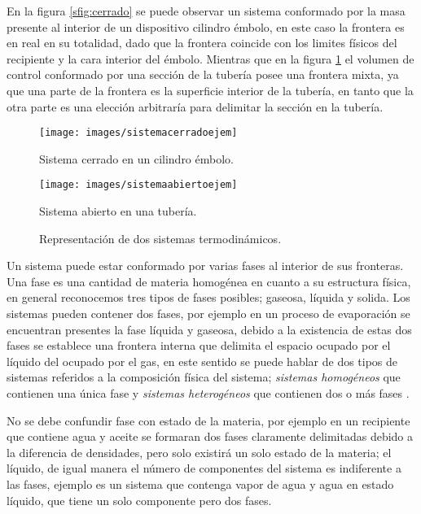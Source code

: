 \documentclass[../master.tex]{subfiles}
\begin{document}
En la figura \ref{sfig:cerrado} se puede observar un sistema conformado por la masa presente al interior de un dispositivo cilindro émbolo, en este caso la frontera es en real en su totalidad, dado que la frontera coincide con los limites físicos del recipiente y la cara interior del émbolo. Mientras que en la figura \ref{sfig:abierto} el volumen de control conformado por una sección de la tubería posee una frontera mixta, ya que una parte de la frontera es la superficie interior de la tubería, en tanto que la otra parte es una elección arbitraría para delimitar la sección en la tubería.

\begin{figure}[htbp]
    \centering
    \begin{subcaptionblock}{0.4\linewidth}
        \centering
        \texttt{[image: images/sistemacerradoejem]}
        \caption{Sistema cerrado en un cilindro émbolo.}
        \label{sfig:cerrado}
    \end{subcaptionblock}
    \begin{subcaptionblock}{0.4\linewidth}
        \centering
        \texttt{[image: images/sistemaabiertoejem]}
        \caption{Sistema abierto en una tubería.}
        \label{sfig:abierto}
    \end{subcaptionblock}
    \caption{Representación de dos sistemas termodinámicos.}
\end{figure}

Un sistema puede estar conformado por varias fases al interior de sus fronteras. Una fase es una cantidad de materia homogénea en cuanto a su estructura física, en general reconocemos tres tipos de fases posibles; gaseosa, líquida y solida. Los sistemas pueden contener dos fases, por ejemplo en un proceso de evaporación se encuentran presentes la fase líquida y gaseosa, debido a la existencia de estas dos fases se establece una frontera interna que delimita el espacio ocupado por el líquido del ocupado por el gas, en este sentido se puede hablar de dos tipos de sistemas referidos a la composición física del sistema; \emph{sistemas homogéneos} que contienen una única fase y \emph{sistemas heterogéneos} que contienen dos o más fases \parencites{wark}{glasstone}.

No se debe confundir fase con estado de la materia, por ejemplo en un recipiente que contiene agua y aceite se formaran dos fases claramente delimitadas debido a la diferencia de densidades, pero solo existirá un solo estado de la materia; el líquido, de igual manera el número de componentes del sistema es indiferente a las fases, ejemplo es un sistema que contenga vapor de agua y agua en estado líquido, que tiene un solo componente pero dos fases.
\end{document}
